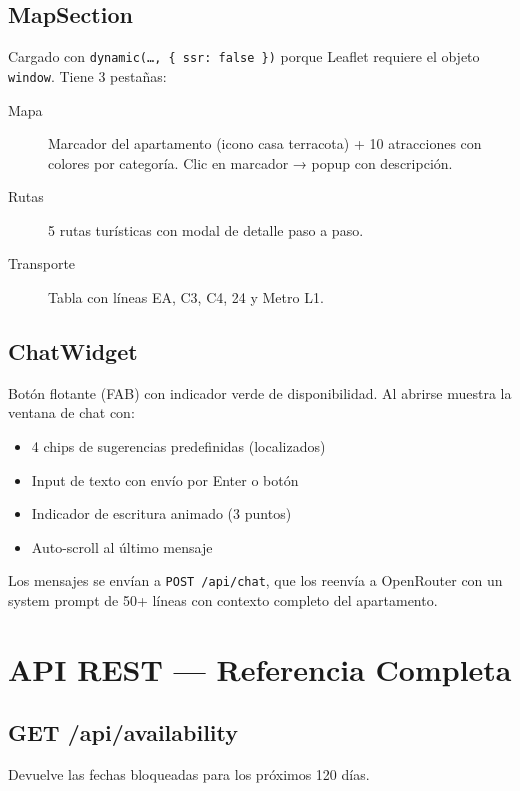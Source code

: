 \documentclass[12pt,a4paper,twoside,openright]{report}
\begin{document}
\section{MapSection}

Cargado con \texttt{dynamic(\dots, \{ ssr: false \})} porque Leaflet requiere
el objeto \texttt{window}. Tiene 3 pestañas:

\begin{description}
  \item[Mapa] Marcador del apartamento (icono casa terracota) + 10 atracciones
              con colores por categoría. Clic en marcador → popup con descripción.
  \item[Rutas] 5 rutas turísticas con modal de detalle paso a paso.
  \item[Transporte] Tabla con líneas EA, C3, C4, 24 y Metro L1.
\end{description}

\section{ChatWidget}

Botón flotante (FAB) con indicador verde de disponibilidad. Al abrirse muestra la
ventana de chat con:
\begin{itemize}
  \item 4 chips de sugerencias predefinidas (localizados)
  \item Input de texto con envío por Enter o botón
  \item Indicador de escritura animado (3 puntos)
  \item Auto-scroll al último mensaje
\end{itemize}

Los mensajes se envían a \texttt{POST /api/chat}, que los reenvía a OpenRouter con
un system prompt de 50+ líneas con contexto completo del apartamento.

\chapter{API REST — Referencia Completa}

\section{GET /api/availability}

Devuelve las fechas bloqueadas para los próximos 120 días.
\end{document}
